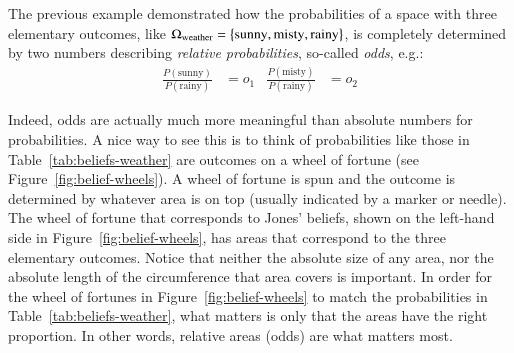 \documentclass[nobib,nofonts]{tufte-handout}
\begin{document}
The previous example demonstrated how the probabilities of a space with three elementary outcomes, like $\Omega_{\text{weather}} = \left\{\text{sunny}, \text{misty}, \text{rainy}\right\}$, is completely determined by two numbers describing \emph{relative probabilities}, so-called \emph{odds}, e.g.:
\begin{align*}
  \frac{P(\text{sunny})}{P(\text{rainy})} & = o_{1} & \frac{P(\text{misty})}{P(\text{rainy})} & = o_{2}
\end{align*}

Indeed, odds are actually much more meaningful than absolute numbers for probabilities.
A nice way to see this is to think of probabilities like those in Table~\ref{tab:beliefs-weather} are outcomes on a wheel of fortune (see Figure~\ref{fig:belief-wheels}).
A wheel of fortune is spun and the outcome is determined by whatever area is on top (usually indicated by a marker or needle).
The wheel of fortune that corresponds to Jones' beliefs, shown on the left-hand side in Figure~\ref{fig:belief-wheels}, has areas that correspond to the three elementary outcomes.
Notice that neither the absolute size of any area, nor the absolute length of the circumference that area covers is important.
In order for the wheel of fortunes in Figure~\ref{fig:belief-wheels} to match the probabilities in Table~\ref{tab:beliefs-weather}, what matters is only that the areas have the right proportion.
In other words, relative areas (odds) are what matters most.
\end{document}
